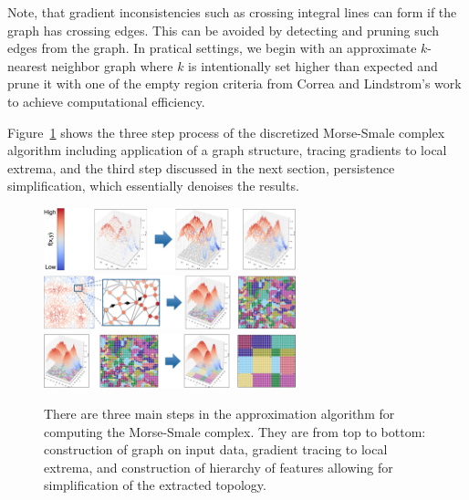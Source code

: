 Note, that gradient inconsistencies such as crossing integral lines can form if the graph has crossing edges.
%
This can be avoided by detecting and pruning such edges from the graph.
%
In pratical settings, we begin with an approximate $k$-nearest neighbor graph where $k$ is intentionally set higher than expected and prune it with one of the empty region criteria from Correa and Lindstrom's work to achieve computational efficiency.

Figure~\ref{fig:mscAlgorithm} shows the three step process of the discretized Morse-Smale complex algorithm including application of a graph structure, tracing gradients to local extrema, and the third step discussed in the next section, persistence simplification, which essentially denoises the results.

\begin{figure}[!ht]
  \centering
  \includegraphics[width=0.65\textwidth]{figs/chap4/amscStep1}
  \includegraphics[width=0.65\textwidth]{figs/chap4/amscStep2}
  \includegraphics[width=0.65\textwidth]{figs/chap4/amscStep3}
  \caption[Illustration of the Morse-Smale Approximation algorithm for unstructured data]{There are three main steps in the approximation algorithm for computing the Morse-Smale complex. They are from top to bottom: construction of graph on input data, gradient tracing to local extrema, and construction of hierarchy of features allowing for simplification of the extracted topology.}
  \label{fig:mscAlgorithm}
\end{figure}


